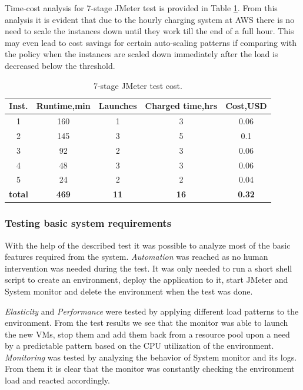 \documentclass[conference]{IEEEtran}
\begin{document}
Time-cost analysis for 7-stage JMeter test is provided in Table \ref{table-test-cost}. From this analysis it is evident that due to the hourly charging system at AWS there is no need to scale the instances down until they work till the end of a full hour. This may even lead to cost savings for certain auto-scaling patterns if comparing with the policy when the instances are scaled down immediately after the load is decreased below the threshold.

\begin{table}[ht]
\begin{center}
  \begin{tabular}{| c | c | c | c | c |}
    \hline
    \textbf{Inst.} & \textbf{Runtime,min} & \textbf{Launches} & \textbf{Charged time,hrs} & \textbf{Cost,USD} \\ \hline
    1 & 160 & 1 & 3 & 0.06 \\ \hline
    2 & 145 & 3 & 5 & 0.1 \\ \hline
    3 & 92 & 2 & 3 & 0.06 \\ \hline
    4 & 48 & 3 & 3 & 0.06 \\ \hline
    5 & 24 & 2 & 2 & 0.04 \\ \hline
    \textbf{total} & \textbf{469} & \textbf{11} & \textbf{16} & \textbf{0.32} \\
    \hline
  \end{tabular}
  \caption{7-stage JMeter test cost.}
  \label{table-test-cost}
\end{center}
\end{table}

\subsubsection{Testing basic system requirements}

With the help of the described test it was possible to analyze most of the basic features required from the system. \emph{Automation} was reached as no human intervention was needed during the test. It was only needed to run a short shell script to create an environment, deploy the application to it, start JMeter and System monitor and delete the environment when the test was done.

\emph{Elasticity} and \emph{Performance} were tested by applying different load patterns to the environment. From the test results we see that the monitor was able to launch the new VMs, stop them and add them back from a resource pool upon a need by a predictable pattern based on the CPU utilization of the environment. \emph{Monitoring} was tested by analyzing the behavior of System monitor and its logs. From them it is clear that the monitor was constantly checking the environment load and reacted accordingly.
\end{document}
